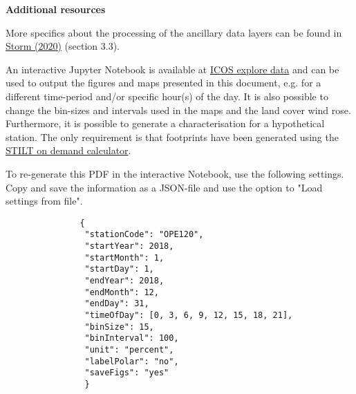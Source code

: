 \documentclass[a4paper,11pt]{article}
\begin{document}
        \pagebreak


        \begin{flushleft}
        \begin{large}
        \textbf{Additional resources}
        \end{large}
        \end{flushleft}

        More specifics about the processing of the ancillary data layers can be found in \href{https://lup.lub.lu.se/student-papers/search/publication/9007298}{Storm (2020)} (section 3.3). \newline

        An interactive Jupyter Notebook is available at \href{https://exploredata.icos-cp.eu}{ICOS explore data} and can be used to output the figures and maps presented in this document, e.g. for a different time-period and/or specific hour(s) of the day. It is also possible to change the bin-sizes and intervals used in the maps and the land cover wind rose. Furthermore, it is possible to generate a characterisation for a hypothetical station. The only requirement is that footprints have been generated using the \href{https://stilt.icos-cp.eu/worker/}{STILT on demand calculator}. \newline
       
     

                To re-generate this PDF in the interactive Notebook, use the following settings. Copy and save the information as a JSON-file and use the option to "Load settings from file".

             \begin{verbatim}
               {
                "stationCode": "OPE120",
                "startYear": 2018,
                "startMonth": 1,
                "startDay": 1,
                "endYear": 2018,
                "endMonth": 12,
                "endDay": 31,
                "timeOfDay": [0, 3, 6, 9, 12, 15, 18, 21],
                "binSize": 15,
                "binInterval": 100,
                "unit": "percent",
                "labelPolar": "no",
                "saveFigs": "yes"
                }
             \end{verbatim}
             
\end{document}
